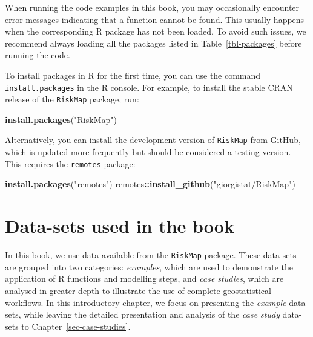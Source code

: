 \documentclass[
  letterpaper,
]{krantz}
\newenvironment{Shaded}{\begin{snugshade}}{\end{snugshade}}
\newcommand{\FunctionTok}[1]{\textcolor[rgb]{0.13,0.29,0.53}{\textbf{#1}}}
\newcommand{\NormalTok}[1]{#1}
\newcommand{\SpecialCharTok}[1]{\textcolor[rgb]{0.81,0.36,0.00}{\textbf{#1}}}
\newcommand{\StringTok}[1]{\textcolor[rgb]{0.31,0.60,0.02}{#1}}
\begin{document}
\begin{tcolorbox}[enhanced jigsaw, leftrule=.75mm, rightrule=.15mm, breakable, opacityback=0, coltitle=black, toprule=.15mm, toptitle=1mm, colbacktitle=quarto-callout-note-color!10!white, bottomrule=.15mm, opacitybacktitle=0.6, arc=.35mm, colback=white, title=\textcolor{quarto-callout-note-color}{\faInfo}\hspace{0.5em}{Note}, colframe=quarto-callout-note-color-frame, titlerule=0mm, bottomtitle=1mm, left=2mm]

When running the code examples in this book, you may occasionally
encounter error messages indicating that a function cannot be found.
This usually happens when the corresponding R package has not been
loaded. To avoid such issues, we recommend always loading all the
packages listed in Table~\ref{tbl-packages} before running the code.

\end{tcolorbox}

To install packages in R for the first time, you can use the command
\texttt{install.packages} in the R console. For example, to install the
stable CRAN release of the \texttt{RiskMap} package, run:

\begin{Shaded}
\begin{Highlighting}[]
\FunctionTok{install.packages}\NormalTok{(}\StringTok{"RiskMap"}\NormalTok{)}
\end{Highlighting}
\end{Shaded}

Alternatively, you can install the development version of
\texttt{RiskMap} from GitHub, which is updated more frequently but
should be considered a testing version. This requires the
\texttt{remotes} package:

\begin{Shaded}
\begin{Highlighting}[]
\FunctionTok{install.packages}\NormalTok{(}\StringTok{"remotes"}\NormalTok{)}
\NormalTok{remotes}\SpecialCharTok{::}\FunctionTok{install\_github}\NormalTok{(}\StringTok{"giorgistat/RiskMap"}\NormalTok{)}
\end{Highlighting}
\end{Shaded}

\section{Data-sets used in the book}\label{sec-examples-ch1}

In this book, we use data available from the \texttt{RiskMap} package.
These data-sets are grouped into two categories: \emph{examples}, which
are used to demonstrate the application of R functions and modelling
steps, and \emph{case studies}, which are analysed in greater depth to
illustrate the use of complete geostatistical workflows. In this
introductory chapter, we focus on presenting the \emph{example}
data-sets, while leaving the detailed presentation and analysis of the
\emph{case study} data-sets to Chapter~\ref{sec-case-studies}.
\end{document}
